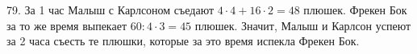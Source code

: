 79. За 1 час Малыш с Карлсоном съедают $4\cdot4+16\cdot2=48$ плюшек. Фрекен Бок за то же время выпекает $60:4\cdot3=45$ плюшек. Значит, Малыш и Карлсон успеют за 2 часа съесть те плюшки, которые за это время испекла Фрекен Бок.\\
